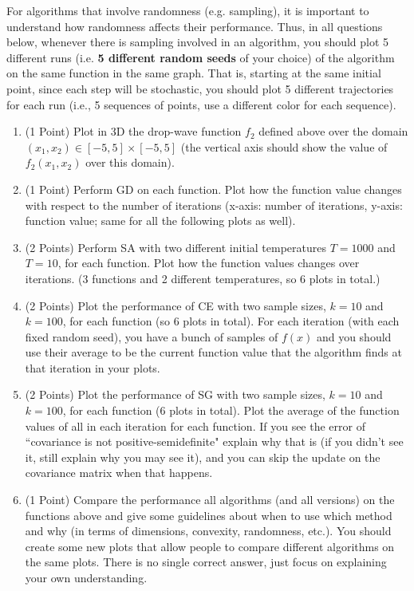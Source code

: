 \documentclass{article}
\begin{document}
\begin{question}
For algorithms that involve randomness (e.g. sampling), it is important to understand how randomness affects their performance. Thus, in all questions below, whenever there is sampling involved in an algorithm, you should plot 5 different runs (i.e. {\bf 5 different random seeds} of your choice) of the algorithm on the same function in the same graph. That is, starting at the same initial point, since each step will be stochastic, you should plot 5 different trajectories for each run (i.e., 5 sequences of points, use a different color for each sequence). 

\begin{enumerate}
    \item (1 Point) Plot in 3D the drop-wave function $f_2$ defined above over the domain $(x_1,x_2)\in  [-5,5]\times [-5,5]$ (the vertical axis should show the value of $f_2(x_1,x_2)$ over this domain). 
    \item (1 Point) Perform GD on each function. Plot how the function value changes with respect to the number of iterations (x-axis: number of iterations, y-axis: function value; same for all the following plots as well). 
    \item (2 Points) Perform SA with two different initial temperatures $T = 1000$ and $T=10$, for each function. Plot how the function values changes over iterations. (3 functions and 2 different temperatures, so 6 plots in total.)  
    \item (2 Points) Plot the performance of CE with two sample sizes, $k=10$ and $k=100$, for each function (so 6 plots in total). For each iteration (with each fixed random seed), you have a bunch of samples of $f(x)$ and you should use their average to be the current function value that the algorithm finds at that iteration in your plots. 
    \item (2 Points) Plot the performance of SG with two sample sizes, $k=10$ and $k=100$, for each function (6 plots in total). Plot the average of the function values of all in each iteration for each function. If you see the error of ``covariance is not positive-semidefinite" explain why that is (if you didn't see it, still explain why you may see it), and you can skip the update on the covariance matrix when that happens. 
    \item (1 Point) Compare the performance all algorithms (and all versions) on the functions above and give some guidelines about when to use which method and why (in terms of dimensions, convexity, randomness, etc.). You should create some new plots that allow people to compare different algorithms on the same plots. There is no single correct answer, just focus on explaining your own understanding. 

\end{enumerate}
\end{question}
\end{document}
